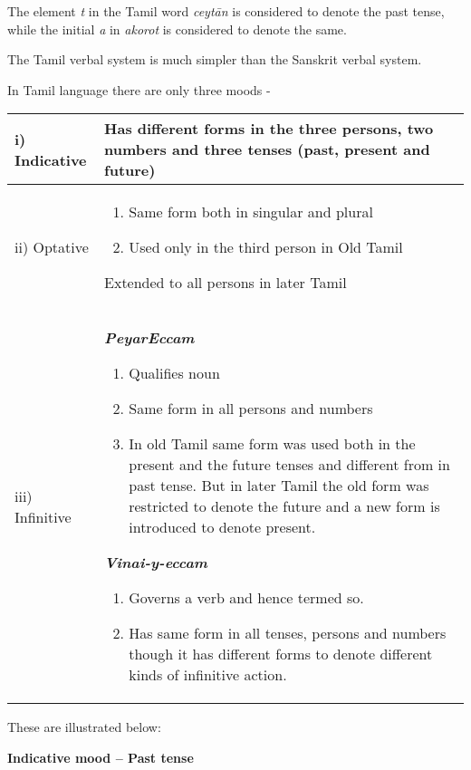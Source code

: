 The element \textit{t} in the Tamil word \textit{ceytān} is considered to denote the past tense, while the initial \textit{a} in \textit{akorot} is considered to denote the same.

The Tamil verbal system is much simpler than the Sanskrit verbal system.

In Tamil language there are only three moods -

\begin{longtable}{|m{2cm}|m{6.8cm}|}
\hline
i) Indicative & Has different forms in the three persons, two numbers and three tenses (past, present and future) \\
\hline
ii) Optative & 
							
\begin{enumerate}\item Same form both in singular and plural 
								\item Used only in the third person in Old Tamil
							
\end{enumerate}
Extended to all persons  in later Tamil

						 \tabularnewline
\hline
iii) Infinitive & 
							\textbf{\textit{PeyarEccam}}

							
\begin{enumerate}\item Qualifies noun
								\item Same form in all persons and numbers
								\item In old Tamil same form was used both in the present and the future tenses and different from in past tense. But in later Tamil the old form was restricted to denote the future and a new form is introduced to denote present.
							
\end{enumerate}
\textbf{\textit{Vinai-y-eccam}}

							
\begin{enumerate}\item Governs a verb and hence termed so.
								\item Has same form in all tenses, persons and numbers though it has different forms to denote different kinds of infinitive action.
							
\end{enumerate}
 \tabularnewline
\hline
\end{longtable}

These are illustrated below:

\textbf{Indicative mood – Past tense}

